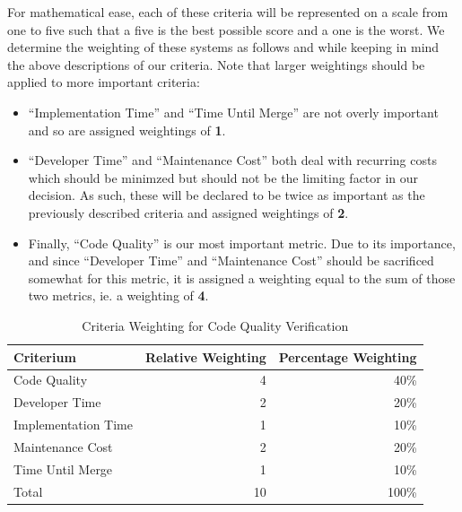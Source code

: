 \documentclass[12pt]{article}
\begin{document}
For mathematical ease, each of these criteria will be represented on a scale from one to five such that a five is the best possible score and a one is the worst. We determine the weighting of these systems as follows and while keeping in mind the above descriptions of our criteria. Note that larger weightings should be applied to more important criteria:
\begin{itemize}
\item ``Implementation Time'' and ``Time Until Merge'' are not overly important and so are assigned weightings of {\bf 1}.
\item ``Developer Time'' and ``Maintenance Cost'' both deal with recurring costs which should be minimzed but should not be the limiting factor in our decision. As such, these will be declared to be twice as important as the previously described criteria and assigned weightings of {\bf 2}.
\item Finally, ``Code Quality'' is our most important metric. Due to its importance, and since ``Developer Time'' and ``Maintenance Cost'' should be sacrificed somewhat for this metric, it is assigned a weighting equal to the sum of those two metrics, ie. a weighting of {\bf 4}.
\end{itemize}

\begin{table}[ht]
\caption{Criteria Weighting for Code Quality Verification}
\label{tbl:weighting-cqv}
\centering
\begin{tabular}{|l|r|r|}
    \hline
    Criterium & Relative Weighting & Percentage Weighting \\
    \hline
    \hline
    Code Quality        &  4 &  40\% \\
    Developer Time      &  2 &  20\% \\
    Implementation Time &  1 &  10\% \\
    Maintenance Cost    &  2 &  20\% \\
    Time Until Merge    &  1 &  10\% \\
    \hline
    \hline
    Total               & 10 & 100\% \\
    \hline
\end{tabular}
\end{table}
\end{document}
